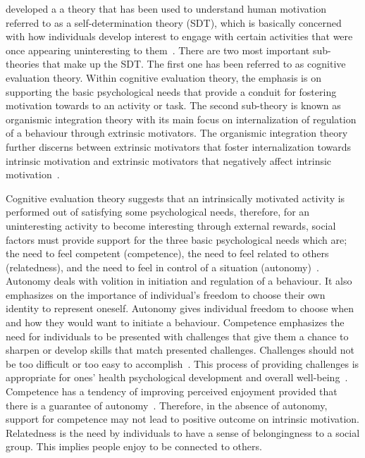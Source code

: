 \cite{deci1985:intrinsic} developed a a theory that has been used to understand human motivation referred to as a self-determination theory (SDT), which is basically concerned with how individuals develop interest to engage with certain activities that were once appearing uninteresting to them~\citep{ryan2000intrinsic}. There are two most important sub-theories that make up the SDT. The first one has been referred to as cognitive evaluation theory. Within cognitive evaluation theory, the emphasis is on supporting the basic psychological needs that provide a conduit for fostering motivation towards to an activity or task. The second sub-theory is known as organismic integration theory with its main focus on internalization of regulation of a behaviour through extrinsic motivators. The organismic integration theory further discerns between extrinsic motivators that foster internalization towards intrinsic motivation and extrinsic motivators that negatively affect intrinsic motivation~\citep{ryan2000:self,lee2015:relating}.

Cognitive evaluation theory suggests that an intrinsically motivated activity is performed out of satisfying some psychological needs, therefore, for an uninteresting activity to become interesting through external rewards, social factors must provide support for the three basic psychological needs which are; the need to feel competent (competence), the need to feel related to others (relatedness), and the need to feel in control of a situation (autonomy)~\citep{ryan2000intrinsic}. Autonomy deals with volition in initiation and regulation of a behaviour. It also emphasizes on the importance of individual's freedom to choose their own identity to represent oneself. Autonomy gives individual freedom to choose when and how they would want to initiate a behaviour. Competence emphasizes the need for individuals to be presented with challenges that give them a chance to sharpen or develop skills that match presented challenges. Challenges should not be too difficult or too easy to accomplish~\citep{zhang2008motivational,colineau2011motivating}. This process of providing challenges is appropriate for ones' health psychological development and  overall well-being~\citep{zhang2008motivational}. Competence has a tendency of improving perceived enjoyment provided that there is a guarantee of autonomy~\citep{forde2015informational}. Therefore, in the absence of autonomy, support for competence may not lead to positive outcome on intrinsic motivation. Relatedness is the need by individuals to have a sense of belongingness to a social group. This implies people enjoy to be connected to others.

